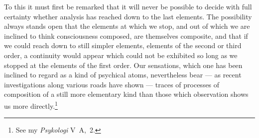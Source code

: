 \documentclass[12pt,a4paper]{book}
\begin{document}
To this it must first be remarked that it will never be possible to decide with
full certainty whether analysis has reached down to the last elements. The
possibility always stands open that the elements at which we stop, and out of
which we are inclined to think consciousness composed, are themselves composite,
and that if we could reach down to still simpler elements, elements of the second
or third order, a continuity would appear which could not be exhibited so long
as we stopped at the elements of the first order. Our sensations, which one has
been inclined to regard as a kind of psychical atoms, nevertheless bear --- as
recent investigations along various roads have shown --- traces of processes of
composition of a still more elementary kind than those which observation shows
us more directly.\footnote{See my \textit{Psykologi} V~A,~2.}
\end{document}
